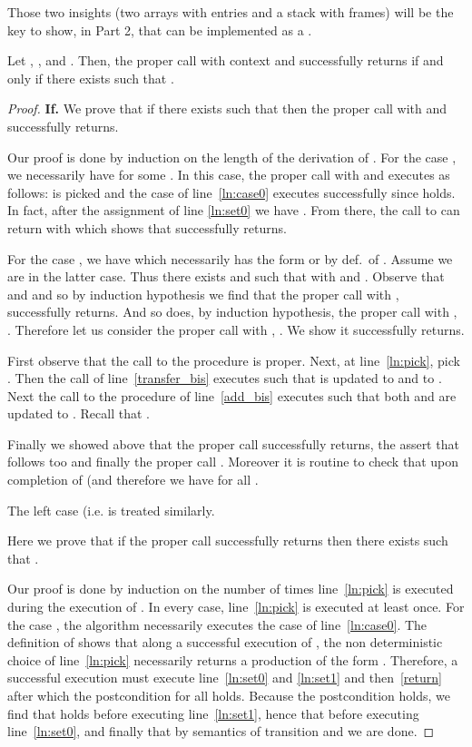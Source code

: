 \documentclass{fsttcs}
\begin{document}
Those two insights (two arrays with  entries and a
stack with  frames) will be the key to show, in Part 2, that
 can be implemented as a .

\begin{lemma}
	Let , , and
	. Then, the proper call
	 with context 
  and 
successfully returns  if and only if  there exists  such that .\label{lem:alg_equiv}
\end{lemma}
\begin{proof}
{\bf If.}
We prove that if there exists  such that
 then the proper call
 with  and
 successfully returns.


Our proof is done by induction on the length  of the derivation of .
For the case , we necessarily have  for some .
In this case, the proper call  with  and
 executes as follows: 
 is picked and the case of line~\ref{ln:case0} executes successfully
since  holds.
In fact, after the assignment of line \ref{ln:set0} we have . From there, the call to 
can return with  which shows that 
successfully returns.

\medskip For the case , we have  which
necessarily has the form 
or  by def.\ of .
Assume we are in the latter case. Thus there exists  and  such
that  with 
and .
Observe that  and  and so
by induction hypothesis we find that the proper call 
with ,  successfully returns.
And so does, by induction hypothesis, the proper call  with
, .
Therefore let us consider the proper call  with , . We show it successfully returns.

First observe that the call to the procedure  is proper.
Next, at line~\ref{ln:pick}, pick .
Then the call  of line~\ref{transfer_bis} executes
such that  is updated to  and  to .
Next the call to the procedure  of line~\ref{add_bis} executes such that
both  and  are updated to . Recall that .

Finally we showed above that the proper call  successfully returns, the assert that follows too and
finally the proper call . Moreover it is routine to check that 
upon completion of  (and therefore
 we have  for all .

The left case (i.e.  is treated similarly.

Here we prove that if the proper call  successfully returns then
there exists  such that .

Our proof is done by induction on the number  of times line~\ref{ln:pick}
is executed during the execution of . 
In every case, line~\ref{ln:pick} is executed at least once.  
For the case , the algorithm necessarily executes the case of line~\ref{ln:case0}.
The definition of  shows that along a successful execution of
, the non deterministic choice of
line~\ref{ln:pick} necessarily returns a production of the form . Therefore, a successful execution must
execute line~\ref{ln:set0} and \ref{ln:set1} and then~\ref{return} after
which the postcondition  for all  holds.  Because the postcondition
holds, we find that  holds
before executing line~\ref{ln:set1}, hence that  before
executing line~\ref{ln:set0}, and finally that  by semantics of transition  and we are done.


\end{proof}
\end{document}
